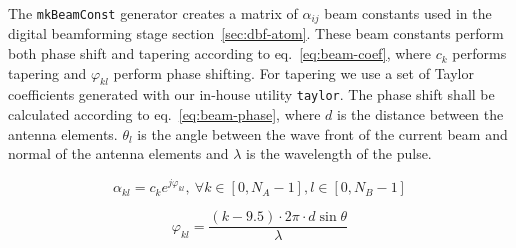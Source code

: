 \documentclass[
  a4paper,
]{article}
\begin{document}
The \texttt{mkBeamConst} generator creates a matrix of \(\alpha_{ij}\)
beam constants used in the digital beamforming stage
section~\ref{sec:dbf-atom}. These beam constants perform both phase
shift and tapering according to eq.~\ref{eq:beam-coef}, where \(c_k\)
performs tapering and \(\varphi_{kl}\) perform phase shifting. For
tapering we use a set of Taylor coefficients generated with our in-house
utility \texttt{taylor}. The phase shift shall be calculated according
to eq.~\ref{eq:beam-phase}, where \(d\) is the distance between the
antenna elements. \(\theta_l\) is the angle between the wave front of
the current beam and normal of the antenna elements and \(\lambda\) is
the wavelength of the pulse.

\begin{equation} \alpha_{kl}=c_k e^{j\varphi_{kl}},\ \forall k\in[0,N_A-1], l \in [0,N_B-1]\label{eq:beam-coef}\end{equation}

\begin{equation} \varphi_{kl}=\frac{(k-9.5)\cdot 2\pi\cdot d \sin\theta}{\lambda}\label{eq:beam-phase}\end{equation}
\end{document}
